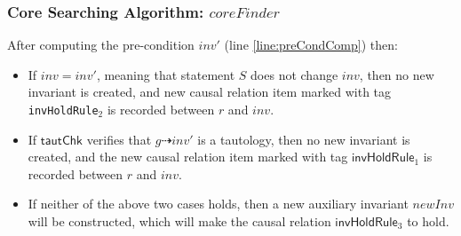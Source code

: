 \documentclass{beamer}
\def \eqc {= }
\def \andc {\wedge }
\def \negc {\neg }
\begin{document}
 \begin{frame}\frametitle{Core Searching Algorithm: $coreFinder$}
After computing the pre-condition $ inv'$ (line \ref{line:preCondComp}) then:

\begin{itemize}
\item If $ inv=inv'$, meaning that statement $S$ does not change $inv$, then no new invariant is created, and  new causal
relation item marked with tag {\tt invHoldRule$_2$} is recorded
between $r$ and $inv$.%

\item If $\mathsf{ tautChk}$ verifies that $g \dashrightarrow inv'$ is a tautology, then  no new invariant is created, and
the new causal relation item marked with tag
$ \mathsf{invHoldRule}_1$ is recorded between $r$ and $inv$. %

\item If neither of the above two cases holds, then a new auxiliary invariant $newInv$ will be constructed, which will make the causal relation $ \mathsf{invHoldRule}_3$  to hold. %
\end{itemize}
 \end{frame}
\end{document}
